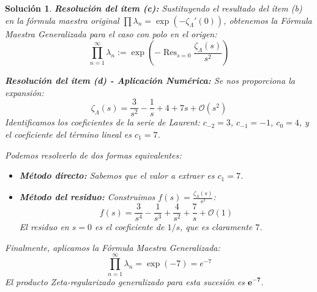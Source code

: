 \documentclass[12pt,a4paper]{article}
\newtheorem{sol}{Solución}
\newcommand{\Res}{\operatorname{Res}}
\begin{document}
\begin{sol}
\vspace{0.3cm}
\textbf{Resolución del ítem (c):}
Sustituyendo el resultado del ítem (b) en la fórmula maestra original $\prod \lambda_n = \exp(-\zeta_{\Lambda}'(0))$, obtenemos la Fórmula Maestra Generalizada para el caso con polo en el origen:
\begin{equation}
    \prod_{n=1}^{\infty} \lambda_n := \exp\left( - \Res_{s=0} \frac{\zeta_{\Lambda}(s)}{s^2} \right)
\end{equation}

\vspace{0.3cm}
\textbf{Resolución del ítem (d) - Aplicación Numérica:}
Se nos proporciona la expansión:
\begin{equation}
    \zeta_{\Lambda}(s) = \frac{3}{s^2} - \frac{1}{s} + 4 + 7s + \mathcal{O}(s^2)
\end{equation}
Identificamos los coeficientes de la serie de Laurent: $c_{-2} = 3$, $c_{-1} = -1$, $c_0 = 4$, y el coeficiente del término lineal es $c_1 = 7$.

Podemos resolverlo de dos formas equivalentes:
\begin{itemize}
    \item \textbf{Método directo:} Sabemos que el valor a extraer es $c_1 = 7$.
    \item \textbf{Método del residuo:} Construimos $f(s) = \frac{\zeta_{\Lambda}(s)}{s^2}$:
    \begin{equation}
        f(s) = \frac{3}{s^4} - \frac{1}{s^3} + \frac{4}{s^2} + \frac{7}{s} + \mathcal{O}(1)
    \end{equation}
    El residuo en $s=0$ es el coeficiente de $1/s$, que es claramente $7$.
\end{itemize}

Finalmente, aplicamos la Fórmula Maestra Generalizada:
\begin{equation}
    \prod_{n=1}^{\infty} \lambda_n = \exp(-7) = e^{-7}
\end{equation}
El producto Zeta-regularizado generalizado para esta sucesión es $\boldsymbol{e^{-7}}$.

\end{sol}
\end{document}
